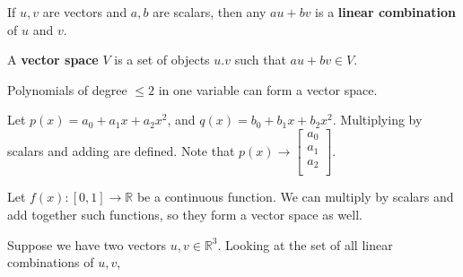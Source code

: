 \begin{definition}
	If \( u,v \) are vectors and \( a,b \) are scalars, then any \( au+bv \) is a \textbf{linear combination} of \( u \) and \( v \).
\end{definition}

\begin{remark}
	A \textbf{vector space} \( V \) is a set of objects \( u.v \) such that \( au+bv \in V\).
\end{remark}

\begin{eg}
	Polynomials of degree \( \le 2 \) in one variable can form a vector space.
\end{eg}
\begin{explanation}
	Let \( p(x) = a_{0}+a_{1}x+a_{2}x^2 \), and \( q(x) = b_{0}+b_{1}x+b_{2}x^2  \). Multiplying by scalars and adding are defined. Note that \( p(x) \to \begin{bmatrix}
		a_{0}\\
		a_{1}\\
		a_{2}\\
	\end{bmatrix} \).
\end{explanation}

\begin{eg}
	Let \( f(x) : [0,1] \to \mathbb{R} \) be a continuous function. We can multiply by scalars and add together such functions, so they form a vector space as well.
\end{eg}

Suppose we have two vectors \( u, v \in \mathbb{R}^3\). Looking at the set of all linear combinations of \( u,v \),
